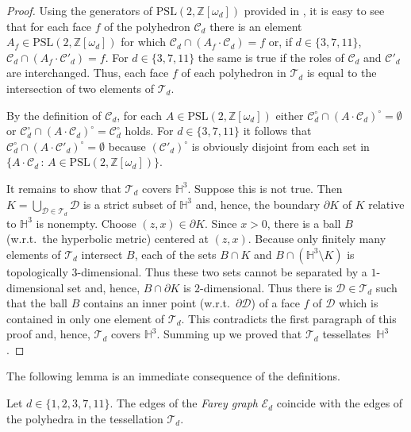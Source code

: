 \documentclass[graybox]{svmult}
\begin{document}
\begin{proof}
Using the generators of $\mathrm{PSL}(2,\mathbb{Z}[\omega_d])$ provided in \cite{Swan:71}, it is easy to see that for each face $f$ of the polyhedron $\mathcal{C}_d$ there is an element $A_f\in \mathrm{PSL}(2,\mathbb{Z}[\omega_d])$ for which $\mathcal{C}_d \cap (A_f\cdot\mathcal{C}_d) = f$ or, if $d\in\{3,7,11\}$, $\mathcal{C}_d \cap (A_f\cdot\mathcal{C}'_d) = f$. For $d\in\{3,7,11\}$ the same is true if the roles of $\mathcal{C}_d$ and $\mathcal{C}'_d$ are interchanged. 
Thus, each face $f$ of each polyhedron in $\mathcal{T}_d$ is equal to the intersection of two elements of $\mathcal{T}_d$.

By the definition of $\mathcal{C}_d$, for each $A \in \mathrm{PSL}(2,\mathbb{Z}[\omega_d])$ either $\mathcal{C}_d^\circ \cap (A\cdot\mathcal{C}_d)^\circ=\emptyset$ or $\mathcal{C}_d^\circ \cap (A\cdot\mathcal{C}_d)^\circ=\mathcal{C}_d^\circ$ holds. For $d\in \{3,7,11\}$ it follows that $\mathcal{C}_d^\circ \cap (A\cdot\mathcal{C}'_d)^\circ=\emptyset$ because $(\mathcal{C}'_d)^\circ$ is obviously disjoint from each set in $\{A\cdot \mathcal{C}_d\,:\,A \in \mathrm{PSL}(2,\mathbb{Z}[\omega_d])\}$.

It remains to show that $\mathcal{T}_d$ covers $\mathbb{H}^3$. Suppose this is not true. Then $K=\bigcup_{ \mathcal{D} \in  \mathcal{T}_d} \mathcal{D}$ is a strict subset of $\mathbb{H}^3$ and, hence, the boundary $\partial K$ of $K$ relative to $\mathbb{H}^3$ is nonempty. Choose $(z,x)\in \partial K$. Since $x>0$, there is a ball $B$ (w.r.t.\ the hyperbolic metric) 
centered at $(z,x)$. 
Because only finitely many elements of $\mathcal{T}_d$ intersect $B$, each of the sets $B \cap K$ and $B \cap (\mathbb{H}^3 \setminus K)$ is topologically  $3$-dimensional. Thus these two sets cannot be separated by a  $1$-dimensional set and, hence, $B\cap \partial K$ is $2$-dimensional. Thus there is $\mathcal{D}\in\mathcal{T}_d$ such that the ball $B$ contains an inner point (w.r.t.\ $\partial \mathcal{D}$) of a face $f$ of $\mathcal{D}$ which is contained in only one element of $\mathcal{T}_d$. This contradicts the first paragraph of this proof and, hence, $\mathcal{T}_d$ covers $\mathbb{H}^3$.
Summing up we proved that $\mathcal{T}_d$ tessellates~$\mathbb{H}^3$.
\end{proof}

The following lemma is an immediate consequence of the definitions.

\begin{lemma}
Let $d\in\{1,2,3,7,11\}$. The edges of the {\em Farey graph} $\mathcal{E}_{d}$ coincide with the edges of the polyhedra in the tessellation $\mathcal{T}_d$.
\end{lemma}
\end{document}
